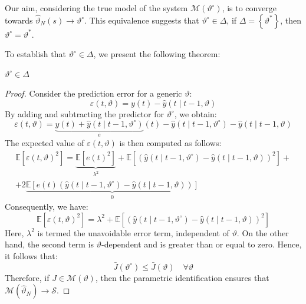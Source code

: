 Our aim, considering the true model of the system $\mathcal{M}(\vartheta^\circ)$, is to converge towards $\hat{\vartheta}_N(s)\rightarrow\vartheta^\circ$. 
This equivalence suggests that $\vartheta^\circ \in \Delta$, if $\Delta=\left\{ \vartheta^\ast \right\}$, then $\vartheta^\circ=\vartheta^\ast$. 

To establish that $\vartheta^\circ \in \Delta$, we present the following theorem:
\begin{theorem}
    $\vartheta^\circ \in \Delta$
\end{theorem}
\begin{proof}
    Consider the prediction error for a generic $\vartheta$:
    \[\varepsilon(t,\vartheta)=y(t)-\hat{y}(t\mid t-1,\vartheta)\]
    By adding and subtracting the predictor for $\vartheta^\circ$, we obtain:
    \[\varepsilon(t,\vartheta)=\underbrace{y(t)+\hat{y}(t\mid t-1,\vartheta^\circ)}_e(t) - \hat{y}(t\mid t-1,\vartheta^\circ)-\hat{y}(t\mid t-1,\vartheta)\]
    The expected value of $\varepsilon(t,\vartheta)$ is then computed as follows:
    \begin{multline*}
        \mathbb{E}\left[ \varepsilon(t,\vartheta)^2 \right] = \underbrace{\mathbb{E}\left[ e(t)^2 \right]}_{\lambda^2}  + \mathbb{E}\left[ \left( \hat{y}(t\mid t-1,\vartheta^\circ)-\hat{y}(t\mid t-1,\vartheta) \right)^2 \right] +\\ +2\underbrace{\mathbb{E}\left[ e(t)\left( \hat{y}(t\mid t-1,\vartheta^\circ)-\hat{y}(t\mid t-1,\vartheta) \right)\right]}_0 
    \end{multline*}
    Consequently, we have:
    \[\mathbb{E}\left[ \varepsilon(t,\vartheta)^2 \right] = \lambda^2 + \mathbb{E}\left[ \left( \hat{y}(t\mid t-1,\vartheta^\circ)-\hat{y}(t\mid t-1,\vartheta) \right)^2 \right]\]
    Here, $\lambda^2$ is termed the unavoidable error term, independent of $\vartheta$. 
    On the other hand, the second term is $\vartheta$-dependent and is greater than or equal to zero. 
    Hence, it follows that:
    \[\bar{J}(\vartheta^\circ) \leq \bar{J}(\vartheta) \quad \forall\vartheta\]
    Therefore, if $J\in\mathcal{M}(\vartheta)$, then the parametric identification ensures that $\mathcal{M}(\hat{\vartheta}_N) \rightarrow \mathcal{S}$. 
\end{proof}

